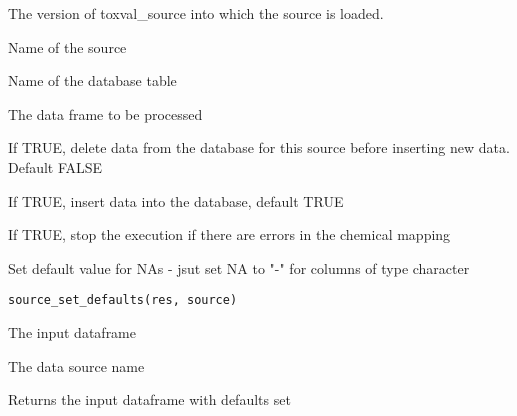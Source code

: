 \documentclass[letterpaper]{book}
\begin{document}
%
\begin{Arguments}
\begin{ldescription}
\item[\code{db}] The version of toxval\_source into which the source is loaded.

\item[\code{source}] Name of the source

\item[\code{table}] Name of the database table

\item[\code{res}] The data frame to be processed

\item[\code{do.reset}] If TRUE, delete data from the database for this source before
inserting new data. Default FALSE

\item[\code{do.insert}] If TRUE, insert data into the database, default TRUE

\item[\code{chem.check.halt}] If TRUE, stop the execution if there are errors in the
chemical  mapping
\end{ldescription}
\end{Arguments}
%
\begin{Description}\relax
Set default value for NAs - jsut set NA to "-" for columns of type character
\end{Description}
%
\begin{Usage}
\begin{verbatim}
source_set_defaults(res, source)
\end{verbatim}
\end{Usage}
%
\begin{Arguments}
\begin{ldescription}
\item[\code{res}] The input dataframe

\item[\code{source}] The data source name
\end{ldescription}
\end{Arguments}
%
\begin{Value}
Returns the input dataframe with defaults set
\end{Value}
\end{document}
